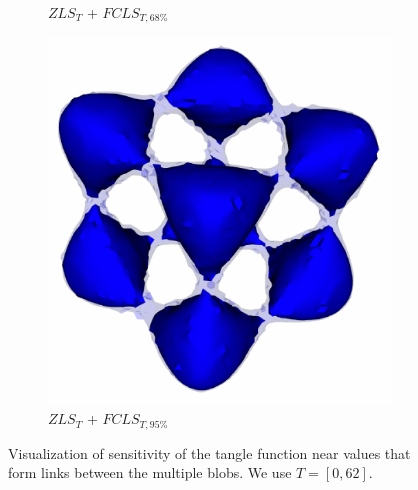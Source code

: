 \begin{figure}[!ht]
\begin{subfigure}{0.195\linewidth}
\vspace{-2mm}
\caption{$ZLS_{T}$ + $FCLS_{T,68\%}$}
\label{fig:tangle_fcls_68}
\end{subfigure}
\begin{subfigure}{0.195\linewidth}
\centering
\includegraphics[width=0.85\linewidth]{Images/Tangle/fcls_95.pdf}
\vspace{-2mm}
\caption{$ZLS_{T}$ + $FCLS_{T,95\%}$}
\label{fig:tangle_fcls_95}
\end{subfigure}
\vspace{-2mm}
\caption{Visualization of sensitivity of the tangle function near values that form links between the multiple blobs. We use $T=[0,62]$.}
\vspace{-2mm}
\label{fig:tangle}
\end{figure}
